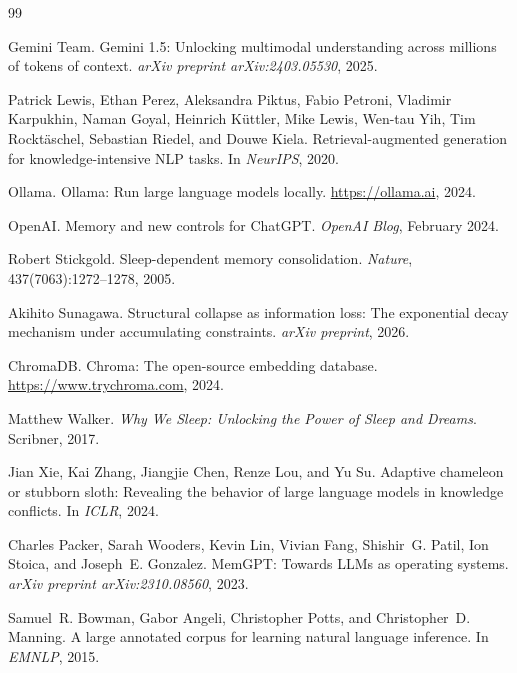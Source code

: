 \documentclass[11pt,a4paper]{article}
\begin{document}
\begin{thebibliography}{99}

Gemini Team.
\newblock Gemini 1.5: Unlocking multimodal understanding across millions of tokens of context.
\newblock \emph{arXiv preprint arXiv:2403.05530}, 2025.

Patrick Lewis, Ethan Perez, Aleksandra Piktus, Fabio Petroni, Vladimir Karpukhin, Naman Goyal, Heinrich K{\"u}ttler, Mike Lewis, Wen-tau Yih, Tim Rockt{\"a}schel, Sebastian Riedel, and Douwe Kiela.
\newblock Retrieval-augmented generation for knowledge-intensive NLP tasks.
\newblock In \emph{NeurIPS}, 2020.

{Ollama}.
\newblock Ollama: Run large language models locally.
\newblock \url{https://ollama.ai}, 2024.

{OpenAI}.
\newblock Memory and new controls for ChatGPT.
\newblock \emph{OpenAI Blog}, February 2024.

Robert Stickgold.
\newblock Sleep-dependent memory consolidation.
\newblock \emph{Nature}, 437(7063):1272--1278, 2005.

Akihito Sunagawa.
\newblock Structural collapse as information loss: The exponential decay mechanism under accumulating constraints.
\newblock \emph{arXiv preprint}, 2026.

{ChromaDB}.
\newblock Chroma: The open-source embedding database.
\newblock \url{https://www.trychroma.com}, 2024.

Matthew Walker.
\newblock \emph{Why We Sleep: Unlocking the Power of Sleep and Dreams}.
\newblock Scribner, 2017.

Jian Xie, Kai Zhang, Jiangjie Chen, Renze Lou, and Yu Su.
\newblock Adaptive chameleon or stubborn sloth: Revealing the behavior of large language models in knowledge conflicts.
\newblock In \emph{ICLR}, 2024.

Charles Packer, Sarah Wooders, Kevin Lin, Vivian Fang, Shishir~G. Patil, Ion Stoica, and Joseph~E. Gonzalez.
\newblock MemGPT: Towards LLMs as operating systems.
\newblock \emph{arXiv preprint arXiv:2310.08560}, 2023.

Samuel~R. Bowman, Gabor Angeli, Christopher Potts, and Christopher~D. Manning.
\newblock A large annotated corpus for learning natural language inference.
\newblock In \emph{EMNLP}, 2015.


\end{thebibliography}
\end{document}
